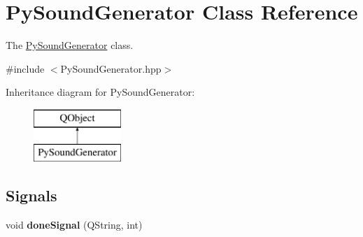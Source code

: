 \hypertarget{classPySoundGenerator}{\section{Py\+Sound\+Generator Class Reference}
\label{classPySoundGenerator}
}


The \hyperlink{classPySoundGenerator}{Py\+Sound\+Generator} class.  




{\ttfamily \#include $<$Py\+Sound\+Generator.\+hpp$>$}

Inheritance diagram for Py\+Sound\+Generator\+:\begin{figure}[H]
\begin{center}
\leavevmode
\includegraphics[height=2.000000cm]{classPySoundGenerator}
\end{center}
\end{figure}
\subsection*{Signals}
\begin{DoxyCompactItemize}
\item 
\hypertarget{classPySoundGenerator_a65289c7a550fec38c31c98771a626935}{void {\bfseries done\+Signal} (Q\+String, int)}\label{classPySoundGenerator_a65289c7a550fec38c31c98771a626935}

\end{DoxyCompactItemize}
